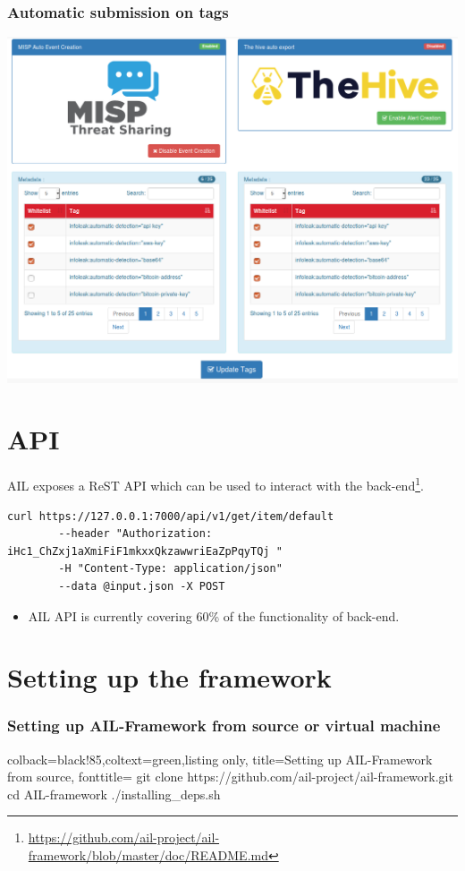 \documentclass{beamer}
\begin{document}
\begin{frame}
    \frametitle{Automatic submission on tags}
    \centerline{\includegraphics[scale=0.25]{screenshot/tag_auto_export.png}}
\end{frame}


\section{API}

\begin{frame}[fragile]
AIL exposes a ReST API which can be used to interact with the back-end\footnote{\url{https://github.com/ail-project/ail-framework/blob/master/doc/README.md}}.

        \begin{lstlisting}
curl https://127.0.0.1:7000/api/v1/get/item/default
        --header "Authorization: iHc1_ChZxj1aXmiFiF1mkxxQkzawwriEaZpPqyTQj "
        -H "Content-Type: application/json"
        --data @input.json -X POST
        \end{lstlisting}
        \begin{itemize}
                \item AIL API is currently covering 60\% of the functionality of back-end.
        \end{itemize}
\end{frame}

\section{Setting up the framework}
\lstset{style=bash}
\begin{frame}[fragile]
    \frametitle{Setting up AIL-Framework from source or virtual machine}
    \begin{tcblisting}{colback=black!85,coltext=green,listing only,
        title=Setting up AIL-Framework from source, fonttitle=\bfseries}
git clone https://github.com/ail-project/ail-framework.git
cd AIL-framework
./installing_deps.sh
\end{tcblisting}
\end{frame}
\end{document}
